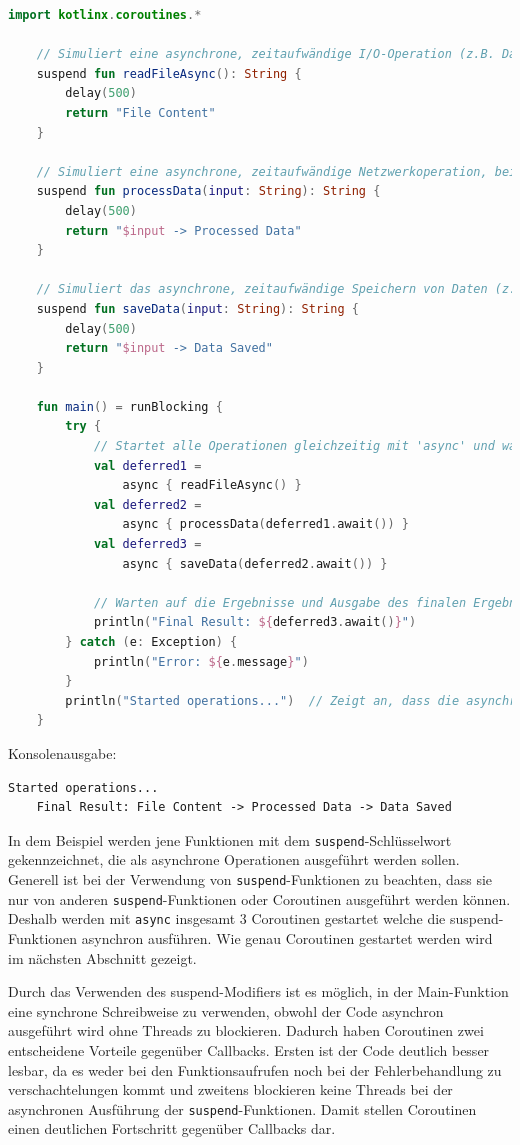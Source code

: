 \documentclass[fontsize=12pt,paper=a4,twoside=semi,parskip=half-,headsepline,headinclude]{scrreprt}
\begin{document}
\begin{lstlisting}[language=Kotlin]
	import kotlinx.coroutines.*

	// Simuliert eine asynchrone, zeitaufwändige I/O-Operation (z.B. Datei lesen)
	suspend fun readFileAsync(): String {
		delay(500)
		return "File Content"
	}

	// Simuliert eine asynchrone, zeitaufwändige Netzwerkoperation, bei der Daten verarbeitet werden (z.B. API-Anfrage)
	suspend fun processData(input: String): String {
		delay(500)
		return "$input -> Processed Data"
	}

	// Simuliert das asynchrone, zeitaufwändige Speichern von Daten (z.B. in einer Datenbank oder Datei)
	suspend fun saveData(input: String): String {
		delay(500)
		return "$input -> Data Saved"
	}

	fun main() = runBlocking {
		try {
			// Startet alle Operationen gleichzeitig mit 'async' und wartet auf deren Ergebnisse
			val deferred1 = 
				async { readFileAsync() }
			val deferred2 = 
				async { processData(deferred1.await()) }
			val deferred3 = 
				async { saveData(deferred2.await()) }
		
			// Warten auf die Ergebnisse und Ausgabe des finalen Ergebnisses
			println("Final Result: ${deferred3.await()}")
		} catch (e: Exception) {
			println("Error: ${e.message}")
		}
		println("Started operations...")  // Zeigt an, dass die asynchronen Operationen gestartet wurden
	}
\end{lstlisting}
Konsolenausgabe:
\begin{lstlisting}[frame=shadowbox, rulecolor=\color{black}, backgroundcolor=\color{gray!10}]
	Started operations...
	Final Result: File Content -> Processed Data -> Data Saved
\end{lstlisting}

In dem Beispiel werden jene Funktionen mit dem \texttt{suspend}-Schlüsselwort gekennzeichnet, die als asynchrone Operationen ausgeführt werden sollen. Generell ist bei der Verwendung von \texttt{suspend}-Funktionen zu beachten, dass sie nur von anderen \texttt{suspend}-Funktionen oder Coroutinen ausgeführt werden können. Deshalb werden mit \texttt{async} insgesamt 3 Coroutinen gestartet welche die {suspend}-Funktionen asynchron ausführen. Wie genau Coroutinen gestartet werden wird im nächsten Abschnitt gezeigt.

Durch das Verwenden des suspend-Modifiers ist es möglich, in der Main-Funktion eine synchrone Schreibweise zu verwenden, obwohl der Code asynchron ausgeführt wird ohne Threads zu blockieren. Dadurch haben Coroutinen zwei entscheidene Vorteile gegenüber Callbacks. Ersten ist der Code deutlich besser lesbar, da es weder bei den Funktionsaufrufen noch bei der Fehlerbehandlung zu verschachtelungen kommt und zweitens blockieren keine Threads bei der asynchronen Ausführung der \texttt{suspend}-Funktionen. Damit stellen Coroutinen einen deutlichen Fortschritt gegenüber Callbacks dar. 
\end{document}
